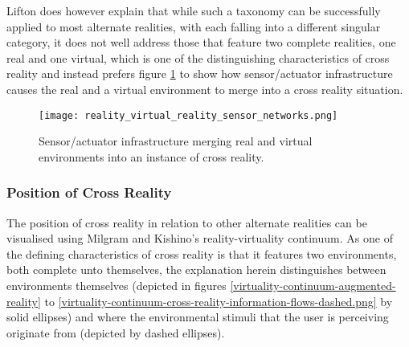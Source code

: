 Lifton does however explain that while such a taxonomy can be successfully applied to most alternate realities, with each falling into a different singular category, it does not well address those that feature two complete realities, one real and one virtual, which is one of the distinguishing characteristics of cross reality and instead prefers figure \ref{reality_virtual_reality_sensor_networks.png} to show how sensor/actuator infrastructure causes the real and a virtual environment to merge into a cross reality situation.

\begin{figure}[h]
	\centering
	\texttt{[image: reality\_virtual\_reality\_sensor\_networks.png]}
	\caption{Sensor/actuator infrastructure merging real and virtual environments into an instance of cross reality.}
	\label{reality_virtual_reality_sensor_networks.png}
\end{figure}



\subsubsection{Position of Cross Reality}

\label{positionofcrossreality}

\newcommand{\avxrfootnote}{\footnote{This discussion over the relationship between augmented reality and cross reality also stands for the relationship between augmented virtuality and cross reality, however as augmented virtuality has received less attention in the literature and in commercially available implementations, the discussion uses augmented reality as its example.}}

The position of cross reality in relation to other alternate realities can be visualised using Milgram and Kishino's reality-virtuality continuum. As one of the defining characteristics of cross reality is that it features two environments, both complete unto themselves, the explanation herein distinguishes between environments themselves (depicted in figures \ref{virtuality-continuum-augmented-reality} to \ref{virtuality-continuum-cross-reality-information-flows-dashed.png} by solid ellipses) and where the environmental stimuli that the user is perceiving originate from (depicted by dashed ellipses).


